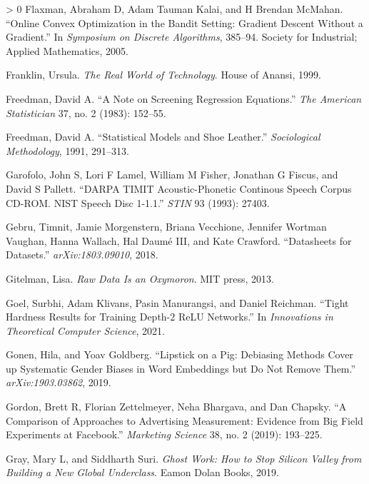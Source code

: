 \documentclass{tufte-book}
\newlength{\cslhangindent}
\newenvironment{CSLReferences}[3] %
 {%
  \setlength{\parindent}{0pt}
  \ifodd #1 \everypar{\setlength{\hangindent}{\cslhangindent}}\ignorespaces\fi
  \ifnum #2 > 0
  \setlength{\parskip}{#3\baselineskip}
  \fi
 }%
 {
 }
\begin{document}
\begin{CSLReferences}{1}{0}
\leavevmode\hypertarget{ref-flaxman2005online}{}%
Flaxman, Abraham D, Adam Tauman Kalai, and H Brendan McMahan. {``Online
Convex Optimization in the Bandit Setting: Gradient Descent Without a
Gradient.''} In \emph{Symposium on Discrete Algorithms}, 385--94.
Society for Industrial; Applied Mathematics, 2005.

\leavevmode\hypertarget{ref-franklin1999real}{}%
Franklin, Ursula. \emph{The Real World of Technology}. House of Anansi,
1999.

\leavevmode\hypertarget{ref-freedman1983note}{}%
Freedman, David A. {``A Note on Screening Regression Equations.''}
\emph{The American Statistician} 37, no. 2 (1983): 152--55.

\leavevmode\hypertarget{ref-freedman1991statistical}{}%
Freedman, David A. {``Statistical Models and Shoe Leather.''}
\emph{Sociological Methodology}, 1991, 291--313.

\leavevmode\hypertarget{ref-garofolo1993darpa}{}%
Garofolo, John S, Lori F Lamel, William M Fisher, Jonathan G Fiscus, and
David S Pallett. {``DARPA {TIMIT} Acoustic-Phonetic Continous Speech
Corpus {CD-ROM}. {NIST} Speech Disc 1-1.1.''} \emph{STIN} 93 (1993):
27403.

\leavevmode\hypertarget{ref-gebru2018datasheets}{}%
Gebru, Timnit, Jamie Morgenstern, Briana Vecchione, Jennifer Wortman
Vaughan, Hanna Wallach, Hal Daumé III, and Kate Crawford. {``Datasheets
for Datasets.''} \emph{arXiv:1803.09010}, 2018.

\leavevmode\hypertarget{ref-gitelman2013raw}{}%
Gitelman, Lisa. \emph{Raw Data Is an Oxymoron}. MIT press, 2013.

\leavevmode\hypertarget{ref-goel21hardness}{}%
Goel, Surbhi, Adam Klivans, Pasin Manurangsi, and Daniel Reichman.
{``Tight Hardness Results for Training Depth-2 ReLU Networks.''} In
\emph{Innovations in Theoretical Computer Science}, 2021.

\leavevmode\hypertarget{ref-gonen2019lipstick}{}%
Gonen, Hila, and Yoav Goldberg. {``Lipstick on a Pig: Debiasing Methods
Cover up Systematic Gender Biases in Word Embeddings but Do Not Remove
Them.''} \emph{arXiv:1903.03862}, 2019.

\leavevmode\hypertarget{ref-gordon2019comparison}{}%
Gordon, Brett R, Florian Zettelmeyer, Neha Bhargava, and Dan Chapsky.
{``A Comparison of Approaches to Advertising Measurement: Evidence from
Big Field Experiments at Facebook.''} \emph{Marketing Science} 38, no. 2
(2019): 193--225.

\leavevmode\hypertarget{ref-gray2019ghost}{}%
Gray, Mary L, and Siddharth Suri. \emph{Ghost Work: How to Stop Silicon
Valley from Building a New Global Underclass}. Eamon Dolan Books, 2019.


\end{CSLReferences}
\end{document}

